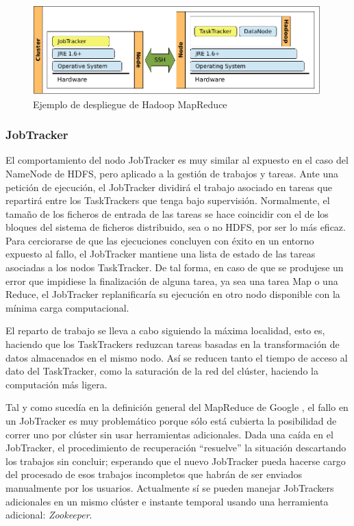 \begin{figure}[tbp]
\begin{center}
\includegraphics[width=0.99\textwidth]{imagenes/020.pdf}
 \caption{Ejemplo de despliegue de Hadoop MapReduce}
\label{fig:desplieguehadoopmapred}
\end{center}
\end{figure}

\subsubsection{JobTracker}\label{subsubsec:jobtracker}
\noindent El comportamiento del nodo JobTracker es muy similar al expuesto en el caso del NameNode de HDFS, pero aplicado a la gesti\'on de trabajos y tareas. Ante una petici\'on de ejecuci\'on, el JobTracker dividir\'a el trabajo asociado en tareas que repartir\'a entre los TaskTrackers que tenga bajo supervisi\'on. Normalmente, el tama\~no de los ficheros de entrada de las tareas se hace coincidir con el de los bloques del sistema de ficheros distribuido, sea o no HDFS, por ser lo m\'as eficaz. Para cerciorarse de que las ejecuciones concluyen con \'exito en un entorno expuesto al fallo, el JobTracker mantiene una lista de estado de las tareas asociadas a los nodos TaskTracker. De tal forma, en caso de que se produjese un error que impidiese la finalizaci\'on de alguna tarea, ya sea una tarea Map o una Reduce, el JobTracker replanificar\'ia su ejecuci\'on en otro nodo disponible con la m\'inima carga computacional.\newline

El reparto de trabajo se lleva a cabo siguiendo la m\'axima localidad, esto es, haciendo que los TaskTrackers reduzcan tareas basadas en la transformaci\'on de datos almacenados en el mismo nodo. As\'i se reducen tanto el tiempo de acceso al dato del TaskTracker, como la saturaci\'on de la red del cl\'uster, haciendo la computaci\'on m\'as ligera.\newline

Tal y como suced\'ia en la definici\'on general del MapReduce de Google \cite{googlemapreduce}, el fallo en un JobTracker es muy problem\'atico porque s\'olo est\'a cubierta la posibilidad de correr uno por cl\'uster sin usar herramientas adicionales. Dada una ca\'ida en el JobTracker, el procedimiento de recuperaci\'on ``resuelve'' la situaci\'on descartando los trabajos sin concluir; esperando que el nuevo JobTracker pueda hacerse cargo del procesado de esos trabajos incompletos que habr\'an de ser enviados manualmente por los usuarios. Actualmente s\'i se pueden manejar JobTrackers adicionales en un mismo cl\'uster e instante temporal usando una herramienta adicional: \emph{Zookeeper}.


